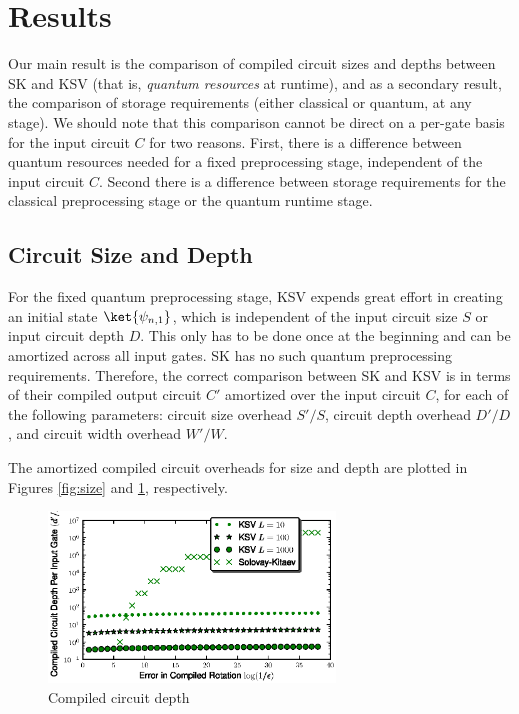\section{Results}
\label{sec:results}

Our main result is the comparison of compiled circuit sizes and depths between 
SK and KSV (that is, \emph{quantum resources} at runtime),
and as a secondary result, the comparison of storage requirements (either
classical or quantum, at any stage).
We should note that this comparison cannot be
direct on a per-gate basis for the input circuit $C$ for two reasons.
First, there is a difference between quantum resources needed for a fixed
preprocessing stage, independent of the input circuit $C$. Second there is a
difference between storage requirements for the classical preprocessing stage
or the quantum runtime stage.

\subsection{Circuit Size and Depth}
\label{subsec:results-size-depth}

For the fixed quantum preprocessing stage,
KSV expends great effort in creating an initial state
$\ket{\psi_{n,1}}$, which is independent of the input circuit size $S$ or
input circuit depth $D$.
This only has to be done once at the beginning and can
be amortized across all input gates. SK has no such quantum preprocessing
requirements.
Therefore, the correct comparison between
SK and KSV is in terms of their compiled output circuit $C'$ amortized over
the input circuit $C$, for each of the following parameters:
circuit size overhead $S'/S$,
circuit depth overhead $D'/D$,
and circuit width overhead $W'/W$.

The amortized compiled circuit overheads for size and depth are plotted in
Figures \ref{fig:size} and
\ref{fig:depth}, respectively.

\begin{center}
\begin{figure}[h!]
\includegraphics[width=3in]{figures/ksv-depth.eps}
\caption{Compiled circuit depth}
\label{fig:depth}
\end{figure}
\end{center}

